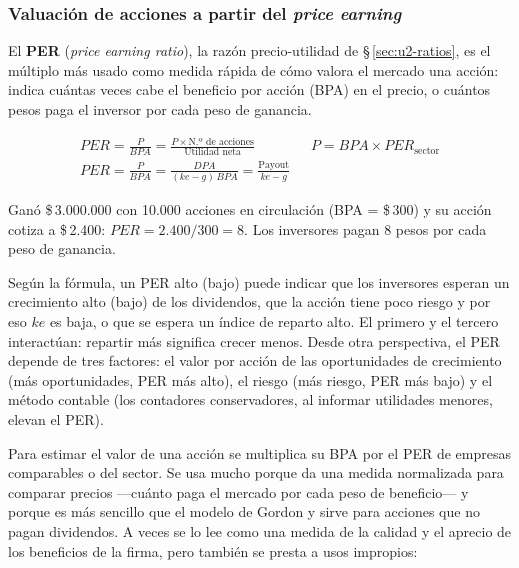 \subsubsection{Valuación de acciones a partir del \emph{price earning}}

El \textbf{PER} (\emph{price earning ratio}), la razón precio-utilidad de §\,\ref{sec:u2-ratios}, es el múltiplo más usado como medida rápida de cómo valora el mercado una acción: indica cuántas veces cabe el beneficio por acción (BPA) en el precio, o cuántos pesos paga el inversor por cada peso de ganancia.

\begin{formulaBox}
\[
\begin{gathered}
PER = \frac{P}{BPA} = \frac{P\times\text{N.º de acciones}}{\text{Utilidad neta}}
\qquad\qquad
P = BPA\times PER_{\text{sector}}
\\[4pt]
PER = \frac{P}{BPA} = \frac{DPA}{(ke-g)\,BPA} = \frac{\text{Payout}}{ke-g}
\end{gathered}
\]
\end{formulaBox}

\begin{ejemplo}[Omega S.\,A.]
Ganó \$\,3.000.000 con 10.000 acciones en circulación (BPA = \$\,300) y su acción cotiza a \$\,2.400: $PER = 2.400/300 = 8$. Los inversores pagan 8 pesos por cada peso de ganancia.
\end{ejemplo}

Según la fórmula, un PER alto (bajo) puede indicar que los inversores esperan un crecimiento alto (bajo) de los dividendos, que la acción tiene poco riesgo y por eso $ke$ es baja, o que se espera un índice de reparto alto. El primero y el tercero interactúan: repartir más significa crecer menos. Desde otra perspectiva, el PER depende de tres factores: el valor por acción de las oportunidades de crecimiento (más oportunidades, PER más alto), el riesgo (más riesgo, PER más bajo) y el método contable (los contadores conservadores, al informar utilidades menores, elevan el PER).

Para estimar el valor de una acción se multiplica su BPA por el PER de empresas comparables o del sector. Se usa mucho porque da una medida normalizada para comparar precios —cuánto paga el mercado por cada peso de beneficio— y porque es más sencillo que el modelo de Gordon y sirve para acciones que no pagan dividendos. A veces se lo lee como una medida de la calidad y el aprecio de los beneficios de la firma, pero también se presta a usos impropios:

